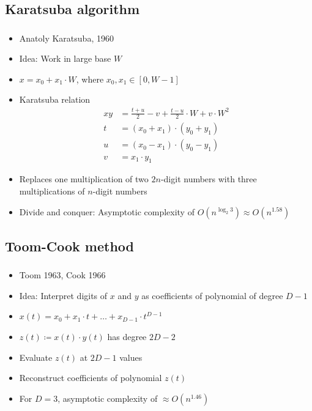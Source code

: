 \documentclass{beamer}
\begin{document}
\subsection{Karatsuba algorithm}

\begin{frame}
		\frametitle{\secname}
		\framesubtitle{\subsecname}

		\begin{itemize}
				\item Anatoly Karatsuba, 1960
				\item Idea: Work in large base $W$
				\item $x = x_0 + x_1 \cdot W$, where $x_0, x_1 \in [0, W - 1]$
				\item Karatsuba relation
						\begin{align*}
								xy & = \frac{t + u}{2} - v + \frac{t - u}{2} \cdot W + v \cdot W^2 \\ 
								t & = (x_0 + x_1) \cdot (y_0 + y_1) \\
								u & = (x_0 - x_1) \cdot (y_0 - y_1) \\
								v & = x_1 \cdot y_1
						\end{align*}
				\item Replaces one multiplication of two $2n$-digit numbers
						with three multiplications of $n$-digit numbers
				\item Divide and conquer: Asymptotic complexity of
						$O(n^{\log_2{3}}) \approx O(n^{1.58})$
		\end{itemize}
\end{frame}

\subsection{Toom-Cook method}

\begin{frame}
		\frametitle{\secname}
		\framesubtitle{\subsecname}

		\begin{itemize}
				\item Toom 1963, Cook 1966
				\item Idea: Interpret digits of $x$ and $y$ as coefficients of polynomial of degree $D - 1$
				\item $x(t) = x_0 + x_1 \cdot t + \ldots + x_{D-1} \cdot t^{D-1}$
				\item $z(t) \coloneqq x(t) \cdot y(t)$ has degree $2D - 2$
				\item Evaluate $z(t)$ at $2D - 1$ values
				\item Reconstruct coefficients of polynomial $z(t)$
				\item For $D = 3$, asymptotic complexity of $\approx O(n^{1.46})$
		\end{itemize}
\end{frame}
\end{document}
